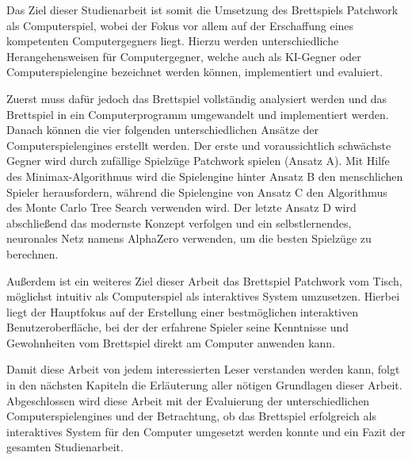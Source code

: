 Das Ziel dieser Studienarbeit ist somit die Umsetzung des Brettspiels Patchwork als Computerspiel, wobei der Fokus vor allem auf der Erschaffung eines kompetenten Computergegners liegt. Hierzu werden unterschiedliche Herangehensweisen für Computergegner, welche auch als \ac{KI}-Gegner oder Computerspielengine bezeichnet werden können, implementiert und evaluiert.

Zuerst muss dafür jedoch das Brettspiel vollständig analysiert werden und das Brettspiel in ein Computerprogramm umgewandelt und implementiert werden. Danach können die vier folgenden unterschiedlichen Ansätze der Computerspielengines erstellt werden. Der erste und voraussichtlich schwächste Gegner wird durch zufällige Spielzüge Patchwork spielen (Ansatz A). Mit Hilfe des Minimax-Algorithmus wird die Spielengine hinter Ansatz B den menschlichen Spieler herausfordern, während die Spielengine von Ansatz C den Algorithmus des Monte Carlo Tree Search verwenden wird. Der letzte Ansatz D wird abschließend das modernste Konzept verfolgen und ein selbstlernendes, neuronales Netz namens AlphaZero verwenden, um die besten Spielzüge zu berechnen.

Außerdem ist ein weiteres Ziel dieser Arbeit das Brettspiel Patchwork vom Tisch, möglichst intuitiv als Computerspiel als interaktives System umzusetzen. Hierbei liegt der Hauptfokus auf der Erstellung einer bestmöglichen interaktiven Benutzeroberfläche, bei der der erfahrene Spieler seine Kenntnisse und Gewohnheiten vom Brettspiel direkt am Computer anwenden kann.

Damit diese Arbeit von jedem interessierten Leser verstanden werden kann, folgt in den nächsten Kapiteln die Erläuterung aller nötigen Grundlagen dieser Arbeit. Abgeschlossen wird diese Arbeit mit der Evaluierung der unterschiedlichen Computerspielengines und der Betrachtung, ob das Brettspiel erfolgreich als interaktives System für den Computer umgesetzt werden konnte und ein Fazit der gesamten Studienarbeit.

